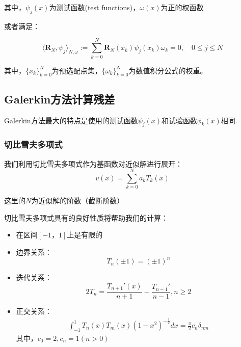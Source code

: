 \documentclass[12pt]{ctexart}
\numberwithin{equation}{section} %
\begin{document}
    其中，$\psi_j(x)$为测试函数(test functions)，$\omega(x)$为正的权函数

    或者满足：

    \begin{equation}
        \boxed{\langle\mathbf{R}_N,\psi_j\rangle_{N,\omega}:=\sum_{k=0}^N\mathbf{R}_N(x_k)\psi_j(x_k)\omega_k=0,\quad0\leq j\leq N}
        \label{eq:加权残差法要求2}
    \end{equation}

    其中，$\{x_k\}_{k=0}^N$为预选配点集，$\{\omega_k\}_{k=0}^N$为数值积分公式的权重。


\subsection{Galerkin方法计算残差}
    Galerkin方法最大的特点是使用的测试函数$\psi_j(x)$和试验函数${\phi_k(x)}$相同.
\subsubsection{切比雪夫多项式}
    我们利用切比雪夫多项式作为基函数对近似解进行展开：
    \begin{equation}
        v(x)=\sum_{k=0}^Na_kT_k(x)
        \label{eq:切比雪夫多项式近似解}
    \end{equation}
    
    这里的$N$为近似解的阶数（截断阶数）

    切比雪夫多项式具有的良好性质将帮助我们的计算：
    \begin{itemize}
        \item 在区间$[-1，1]$上是有限的
        \item 边界关系：
        \begin{equation}
            T_n(\pm1)=(\pm1)^n
        \label{eq:切比雪夫多项式边界关系}
        \end{equation}
        \item 迭代关系：
        \begin{equation}
        2T_n=\frac{T_{n+1}'(x)}{n+1}-\frac{T_{n-1}'}{n-1},n\ge2
        \label{eq:切比雪夫多项式迭代关系}
        \end{equation}
        \item 正交关系：
        \begin{equation}
            \begin{aligned}\int_{-1}^1T_n(x)T_m(x)(1-x^2)^{-\frac{1}{2}}dx=\frac{\pi}{2}c_n\delta_{nm}\end{aligned}
        \label{eq:切比雪夫多项正交关系}
        \end{equation}
        其中，$c_0=2,c_n=1(n>0)$
    \end{itemize}
\end{document}
